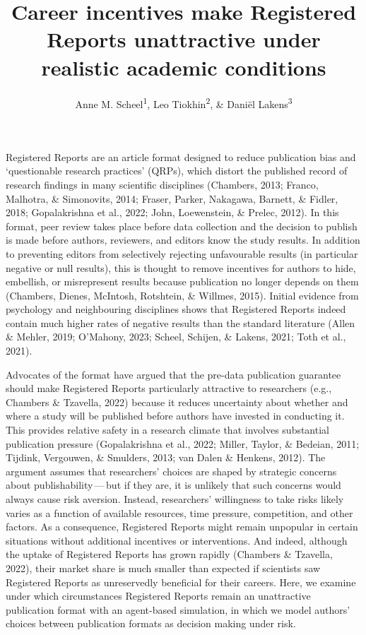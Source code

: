 \documentclass[
  british,
  a4paper,
  ,man,floatsintext]{apa6}
\title{Career incentives make Registered Reports unattractive under realistic academic conditions}
\author{Anne M. Scheel\textsuperscript{1}, Leo Tiokhin\textsuperscript{2}, \& Daniël Lakens\textsuperscript{3}}
\date{}
\affiliation{\vspace{0.5cm}\textsuperscript{1} Utrecht University\\\textsuperscript{2} Deciding Better\\\textsuperscript{3} Eindhoven University of Technology}
\begin{document}
\maketitle

Registered Reports are an article format designed to reduce publication bias and `questionable research practices' (QRPs), which distort the published record of research findings in many scientific disciplines (Chambers, 2013; Franco, Malhotra, \& Simonovits, 2014; Fraser, Parker, Nakagawa, Barnett, \& Fidler, 2018; Gopalakrishna et al., 2022; John, Loewenstein, \& Prelec, 2012).
In this format, peer review takes place before data collection and the decision to publish is made before authors, reviewers, and editors know the study results.
In addition to preventing editors from selectively rejecting unfavourable results (in particular negative or null results), this is thought to remove incentives for authors to hide, embellish, or misrepresent results because publication no longer depends on them (Chambers, Dienes, McIntosh, Rotshtein, \& Willmes, 2015).
Initial evidence from psychology and neighbouring disciplines shows that Registered Reports indeed contain much higher rates of negative results than the standard literature (Allen \& Mehler, 2019; O'Mahony, 2023; Scheel, Schijen, \& Lakens, 2021; Toth et al., 2021).

Advocates of the format have argued that the pre-data publication guarantee should make Registered Reports particularly attractive to researchers (e.g., Chambers \& Tzavella, 2022)
because it reduces uncertainty about whether and where a study will be published before authors have invested in conducting it.
This provides relative safety in a research climate that involves substantial publication pressure (Gopalakrishna et al., 2022; Miller, Taylor, \& Bedeian, 2011; Tijdink, Vergouwen, \& Smulders, 2013; van Dalen \& Henkens, 2012).
The argument assumes that researchers' choices are shaped by strategic concerns about publishability\(\,\)---\(\,\)but if they are, it is unlikely that such concerns would always cause risk aversion.
Instead, researchers' willingness to take risks likely varies as a function of available resources, time pressure, competition, and other factors.
As a consequence, Registered Reports might remain unpopular in certain situations without additional incentives or interventions.
And indeed, although the uptake of Registered Reports has grown rapidly (Chambers \& Tzavella, 2022), their market share is much smaller than expected if scientists saw Registered Reports as unreservedly beneficial for their careers.
Here, we examine under which circumstances Registered Reports remain an unattractive publication format with an agent-based simulation, in which we model authors' choices between publication formats as decision making under risk.
\end{document}
